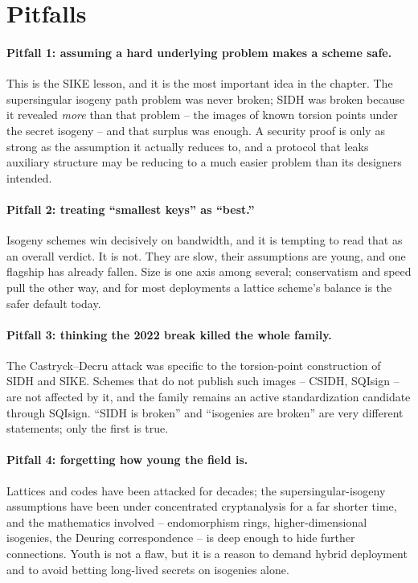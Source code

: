 \section{Pitfalls}

\paragraph{Pitfall 1: assuming a hard underlying problem makes a scheme safe.}
This is the SIKE lesson, and it is the most important idea in the chapter. The supersingular isogeny path problem was never broken; SIDH was broken because it revealed \emph{more} than that problem -- the images of known torsion points under the secret isogeny -- and that surplus was enough. A security proof is only as strong as the assumption it actually reduces to, and a protocol that leaks auxiliary structure may be reducing to a much easier problem than its designers intended.

\paragraph{Pitfall 2: treating ``smallest keys'' as ``best.''}
Isogeny schemes win decisively on bandwidth, and it is tempting to read that as an overall verdict. It is not. They are slow, their assumptions are young, and one flagship has already fallen. Size is one axis among several; conservatism and speed pull the other way, and for most deployments a lattice scheme's balance is the safer default today.

\paragraph{Pitfall 3: thinking the 2022 break killed the whole family.}
The Castryck--Decru attack was specific to the torsion-point construction of SIDH and SIKE. Schemes that do not publish such images -- CSIDH, SQIsign -- are not affected by it, and the family remains an active standardization candidate through SQIsign. ``SIDH is broken'' and ``isogenies are broken'' are very different statements; only the first is true.

\paragraph{Pitfall 4: forgetting how young the field is.}
Lattices and codes have been attacked for decades; the supersingular-isogeny assumptions have been under concentrated cryptanalysis for a far shorter time, and the mathematics involved -- endomorphism rings, higher-dimensional isogenies, the Deuring correspondence -- is deep enough to hide further connections. Youth is not a flaw, but it is a reason to demand hybrid deployment and to avoid betting long-lived secrets on isogenies alone.

